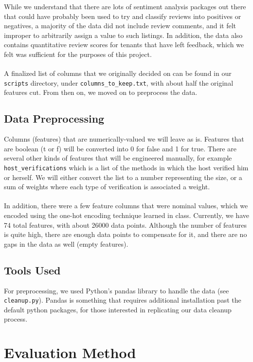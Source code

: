 \documentclass{article}
\begin{document}
While we understand that there are lots of sentiment analysis packages out there that could have probably been used to try and classify reviews into positives or negatives, a majority of the data did not include review comments, and it felt improper to arbitrarily assign a value to such listings. In addition, the data also contains quantitative review scores for tenants that have left feedback, which we felt was sufficient for the purposes of this project.
\\ \\
A finalized list of columns that we originally decided on can be found in our \texttt{scripts} directory, under \texttt{columns\_to\_keep.txt}, with about half the original features cut. From then on, we moved on to preprocess the data.

\subsection{Data Preprocessing}
Columns (features) that are numerically-valued we will leave as is. Features that are boolean (t or f) will be converted into 0 for false and 1 for true. There are several other kinds of features that will be engineered manually, for example \texttt{host\_verifications} which is a list of the methods in which the host verified him or herself. We will either convert the list to a number representing the size, or a sum of weights where each type of verification is associated a weight.
\\ \\
In addition, there were a few feature columns that were nominal values, which we encoded using the one-hot encoding technique learned in class. Currently, we have 74 total features, with about 26000 data points. Although the number of features is quite high, there are enough data points to compensate for it, and there are no gaps in the data as well (empty features).

\subsection{Tools Used}
For preprocessing, we used Python's pandas library to handle the data (see \texttt{cleanup.py}). Pandas is something that requires additional installation past the default python packages, for those interested in replicating our data cleanup process.

\section{Evaluation Method}
\end{document}
